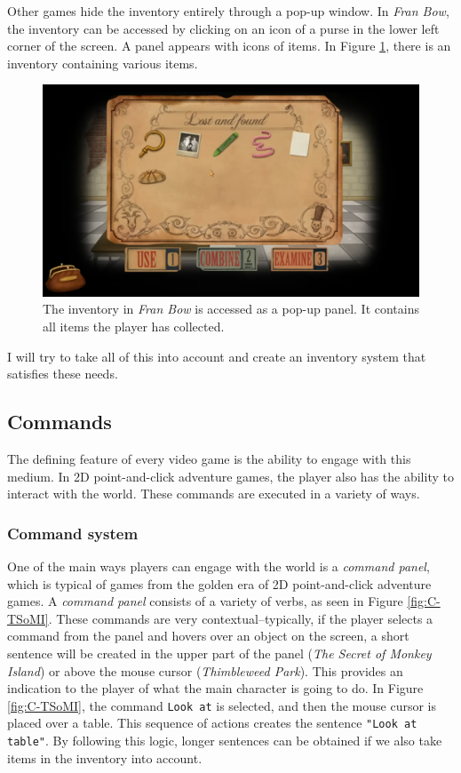 Other games hide the inventory entirely through a pop-up window. In \textit{Fran Bow}, the inventory can be accessed by clicking on an icon of a purse in the lower left corner of the screen. A panel appears with icons of items. In Figure \ref{fig:I-FranBow}, there is an inventory containing various items.
\begin{figure}[H]
\centering
\includegraphics[width=1.\linewidth]{img/I-FB.png}
\caption{The inventory in \textit{Fran Bow} is accessed as a pop-up panel. It contains all items the player has collected.}
\label{fig:I-FranBow}
\end{figure}

I will try to take all of this into account and create an inventory system that satisfies these needs.
 
\subsection{Commands}
The defining feature of every video game is the ability to engage with this medium. In 2D point-and-click adventure games, the player also has the ability to interact with the world. These commands are executed in a variety of ways.

\subsubsection{Command system}
One of the main ways players can engage with the world is a \textit{command panel}, which is typical of games from the golden era of 2D point-and-click adventure games. A \textit{command panel} consists of a variety of verbs, as seen in Figure \ref{fig:C-TSoMI}. These commands are very contextual--typically, if the player selects a command from the panel and hovers over an object on the screen, a short sentence will be created in the upper part of the panel (\textit{The Secret of Monkey Island}) or above the mouse cursor (\textit{Thimbleweed Park}). This provides an indication to the player of what the main character is going to do. In Figure \ref{fig:C-TSoMI}, the command \texttt{Look at} is selected, and then the mouse cursor is placed over a table. This sequence of actions creates the sentence \texttt{"Look at table"}. By following this logic, longer sentences can be obtained if we also take items in the inventory into account.

